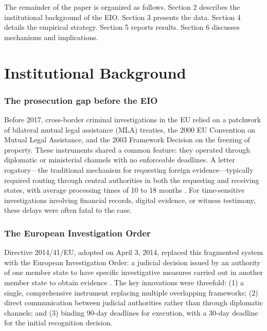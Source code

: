 \documentclass[12pt]{article}
\begin{document}
The remainder of the paper is organized as follows. Section 2 describes the institutional background of the EIO. Section 3 presents the data. Section 4 details the empirical strategy. Section 5 reports results. Section 6 discusses mechanisms and implications.


\section{Institutional Background}

\subsubsection*{The prosecution gap before the EIO}  Before 2017, cross-border criminal investigations in the EU relied on a patchwork of bilateral mutual legal assistance (MLA) treaties, the 2000 EU Convention on Mutual Legal Assistance, and the 2003 Framework Decision on the freezing of property. These instruments shared a common feature: they operated through diplomatic or ministerial channels with no enforceable deadlines. A letter rogatory---the traditional mechanism for requesting foreign evidence---typically required routing through central authorities in both the requesting and receiving states, with average processing times of 10 to 18 months \citep{vernimmen2015eio}. For time-sensitive investigations involving financial records, digital evidence, or witness testimony, these delays were often fatal to the case.

\subsubsection*{The European Investigation Order}  Directive 2014/41/EU, adopted on April 3, 2014, replaced this fragmented system with the European Investigation Order: a judicial decision issued by an authority of one member state to have specific investigative measures carried out in another member state to obtain evidence \citep{mangiaracina2014eio}. The key innovations were threefold: (1) a single, comprehensive instrument replacing multiple overlapping frameworks; (2) direct communication between judicial authorities rather than through diplomatic channels; and (3) binding 90-day deadlines for execution, with a 30-day deadline for the initial recognition decision.
\end{document}
